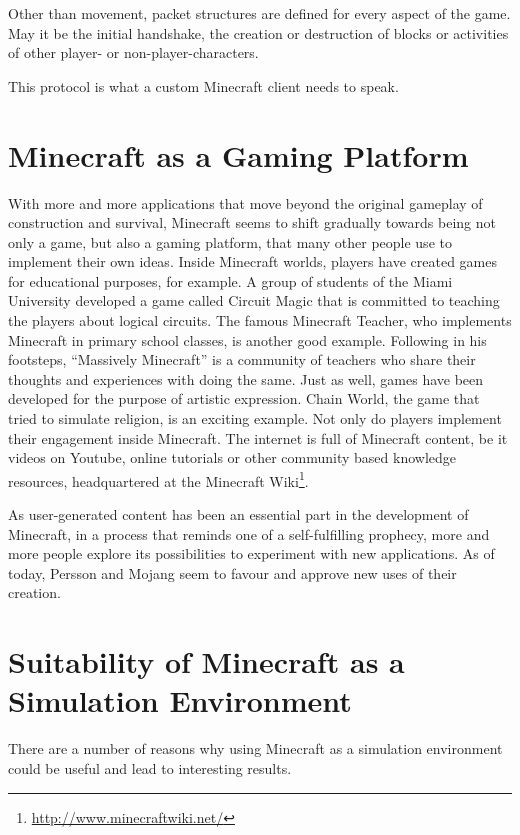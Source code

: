 Other than movement, packet structures are defined for every aspect of the game. May it be the initial handshake, the creation or destruction of blocks or activities of other player- or non-player-characters.

This protocol is what a custom Minecraft client needs to speak.

    \section{Minecraft as a Gaming Platform}
With more and more applications that move beyond the original gameplay of construction and survival, Minecraft seems to shift gradually towards being not only a game, but also a gaming platform, that many other people use to implement their own ideas. Inside Minecraft worlds, players have created games for educational purposes, for example. A group of students of the Miami University developed a game called Circuit Magic that is committed to teaching the players about logical circuits. The famous Minecraft Teacher, who implements Minecraft in primary school classes, is another good example. Following in his footsteps, ``Massively Minecraft'' is a community of teachers who share their thoughts and experiences with doing the same. Just as well, games have been developed for the purpose of artistic expression. Chain World, the game that tried to simulate religion, is an exciting example. Not only do players implement their engagement inside Minecraft. The internet is full of Minecraft content, be it videos on Youtube, online tutorials or other community based knowledge resources, headquartered at the Minecraft Wiki\footnote{\url{http://www.minecraftwiki.net/}}.~\cite{Duncan:2011:MBC:2207096.2207097}

As user-generated content has been an essential part in the development of Minecraft, in a process that reminds one of a self-fulfilling prophecy, more and more people explore its possibilities to experiment with new applications. As of today, Persson and Mojang seem to favour and approve new uses of their creation.~\cite{Duncan:2011:MBC:2207096.2207097}

    \section{Suitability of Minecraft as a Simulation Environment}
There are a number of reasons why using Minecraft as a simulation environment could be useful and lead to interesting results.

